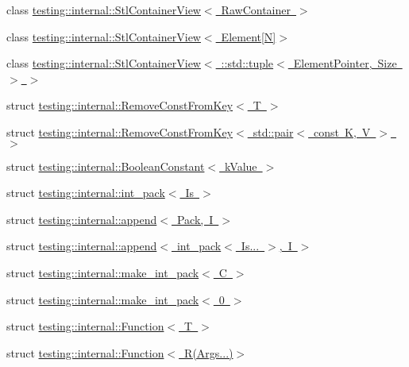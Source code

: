 \begin{DoxyCompactItemize}
\item 
class \mbox{\hyperlink{classtesting_1_1internal_1_1_stl_container_view}{testing\+::internal\+::\+Stl\+Container\+View$<$ Raw\+Container $>$}}
\item 
class \mbox{\hyperlink{classtesting_1_1internal_1_1_stl_container_view_3_01_element[_n]_4}{testing\+::internal\+::\+Stl\+Container\+View$<$ Element\mbox{[}\+N\mbox{]}$>$}}
\item 
class \mbox{\hyperlink{classtesting_1_1internal_1_1_stl_container_view_3_01_1_1std_1_1tuple_3_01_element_pointer_00_01_size_01_4_01_4}{testing\+::internal\+::\+Stl\+Container\+View$<$ \+::std\+::tuple$<$ Element\+Pointer, Size $>$ $>$}}
\item 
struct \mbox{\hyperlink{structtesting_1_1internal_1_1_remove_const_from_key}{testing\+::internal\+::\+Remove\+Const\+From\+Key$<$ T $>$}}
\item 
struct \mbox{\hyperlink{structtesting_1_1internal_1_1_remove_const_from_key_3_01std_1_1pair_3_01const_01_k_00_01_v_01_4_01_4}{testing\+::internal\+::\+Remove\+Const\+From\+Key$<$ std\+::pair$<$ const K, V $>$ $>$}}
\item 
struct \mbox{\hyperlink{structtesting_1_1internal_1_1_boolean_constant}{testing\+::internal\+::\+Boolean\+Constant$<$ k\+Value $>$}}
\item 
struct \mbox{\hyperlink{structtesting_1_1internal_1_1int__pack}{testing\+::internal\+::int\+\_\+pack$<$ Is $>$}}
\item 
struct \mbox{\hyperlink{structtesting_1_1internal_1_1append}{testing\+::internal\+::append$<$ Pack, I $>$}}
\item 
struct \mbox{\hyperlink{structtesting_1_1internal_1_1append_3_01int__pack_3_01_is_8_8_8_01_4_00_01_i_01_4}{testing\+::internal\+::append$<$ int\+\_\+pack$<$ Is... $>$, I $>$}}
\item 
struct \mbox{\hyperlink{structtesting_1_1internal_1_1make__int__pack}{testing\+::internal\+::make\+\_\+int\+\_\+pack$<$ C $>$}}
\item 
struct \mbox{\hyperlink{structtesting_1_1internal_1_1make__int__pack_3_010_01_4}{testing\+::internal\+::make\+\_\+int\+\_\+pack$<$ 0 $>$}}
\item 
struct \mbox{\hyperlink{structtesting_1_1internal_1_1_function}{testing\+::internal\+::\+Function$<$ T $>$}}
\item 
struct \mbox{\hyperlink{structtesting_1_1internal_1_1_function_3_01_r_07_args_8_8_8_08_4}{testing\+::internal\+::\+Function$<$ R(\+Args...)$>$}}
\end{DoxyCompactItemize}
